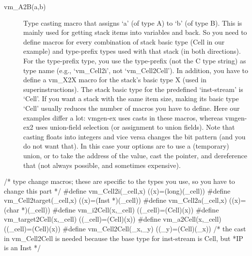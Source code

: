 \documentclass[10pt,english]{article}
\begin{document}
\begin{description}
\item [{vm\_A2B(a,b)}] Type casting macro that assigns \textquoteleft{}a\textquoteright{}
(of type A) to \textquoteleft{}b\textquoteright{} (of type B). This
is mainly used for getting stack items into variables and back. So
you need to define macros for every combination of stack basic type
(Cell in our example) and type-prefix types used with that stack (in
both directions). For the type-prefix type, you use the type-prefix
(not the C type string) as type name (e.g., \textquoteleft{}vm\_Cell2i\textquoteright{},
not \textquoteleft{}vm\_Cell2Cell\textquoteright{}). In addition,
you have to define a vm\_X2X macro for the stack's basic type X (used
in superinstructions). The stack basic type for the predefined \textquoteleft{}inst-stream\textquoteright{}
is \textquoteleft{}Cell\textquoteright{}. If you want a stack with
the same item size, making its basic type \textquoteleft{}Cell\textquoteright{}
usually reduces the number of macros you have to define. Here our
examples differ a lot: vmgen-ex uses casts in these macros, whereas
vmgen-ex2 uses union-field selection (or assignment to union fields).
Note that casting floats into integers and vice versa changes the
bit pattern (and you do not want that). In this case your options
are to use a (temporary) union, or to take the address of the value,
cast the pointer, and dereference that (not always possible, and sometimes
expensive).
\end{description}
\nwenddocs{}\endmoddef
/* type change macros; these are specific to the types you use, so you
   have to change this part */
#define vm_Cell2i(_cell,x)      ((x)=(long)(_cell))
#define vm_Cell2target(_cell,x) ((x)=(Inst *)(_cell))
#define vm_Cell2a(_cell,x)      ((x)=(char *)(_cell))
#define vm_i2Cell(x,_cell)      ((_cell)=(Cell)(x))
#define vm_target2Cell(x,_cell) ((_cell)=(Cell)(x))
#define vm_a2Cell(x,_cell)      ((_cell)=(Cell)(x))
#define vm_Cell2Cell(_x,_y)     ((_y)=(Cell)(_x))
/* the cast in vm_Cell2Cell is needed because the base type for
   inst-stream is Cell, but *IP is an Inst */
\nwendcode{}\nwdocspar
\end{document}

